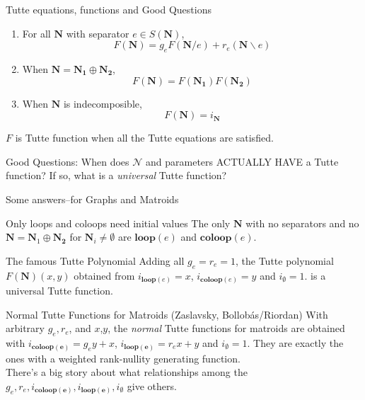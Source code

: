 \documentclass{beamer}
\newcommand{\ext}[1]{\ensuremath{\mathbf{#1}}}
\begin{document}
 


\begin{frame}{Tutte equations, functions and Good Questions}
  \begin{enumerate}
  \item For all $\ext{N}$ with separator $e\in S(\ext{N})$,
    \[
    F(\ext{N}) = g_eF(\ext{N}/e) + r_e(\ext{N}\backslash e)
    \]
  \item When $\ext{N}=\ext{N_1}\oplus\ext{N_2}$,
    \[
    F(\ext{N}) = F(\ext{N_1})F(\ext{N_2})
    \]
  \item When $\ext{N}$ is indecomposible,
    \[
    F(\ext{N}) = i_{\ext{N}}
    \]
  \end{enumerate}
  $F$ is Tutte function when all the Tutte equations are satisfied.

  
  
  Good Questions: When does $\mathcal{N}$ and parameters ACTUALLY
  HAVE a Tutte function?  If so, what is a \emph{universal} Tutte function?

\end{frame}

\begin{frame}{Some answers--for Graphs and Matroids}

  \begin{block}{Only loops and coloops need initial values}
    The only
    $\ext{N}$ with no separators and no $\ext{N}=\ext{N}_1\oplus\ext{N_2}$
    for $\ext{N}_i\neq\emptyset$ are $\mathbf{loop}(e)$
    and $\mathbf{coloop}(e)$.
  \end{block}


  \begin{block}{The famous Tutte Polynomial}
  Adding all $g_e=r_e=1$, the Tutte polynomial $F(\ext{N})(x,y)$
  obtained from $i_{\mathbf{loop}(e)}=x$, 
  $i_{\mathbf{coloop}(e)}=y$ and $i_{\mathbf{\emptyset}}=1$.
  is a universal Tutte function.
  \end{block}
  
  \begin{block}{Normal Tutte Functions for Matroids}
    (Zaslavsky, Bollob\'{a}s/Riordan) With arbitrary $g_e,r_e$, and $x$,$y$, the \emph{normal} Tutte functions
    for matroids are obtained with $i_{\mathbf{coloop(e)}}=g_ey + x$,
  $i_{\mathbf{loop(e)}}=r_ex + y$ and  $i_{\mathbf{\emptyset}}=1$.
    They are exactly the ones with a weighted rank-nullity generating function.\\
    There's a big story about what relationships among the
    $g_e, r_e, i_{\mathbf{coloop(e)}} ,i_{\mathbf{loop(e)}}, i_\emptyset$ give others.
  \end{block}

\end{frame}
\end{document}
